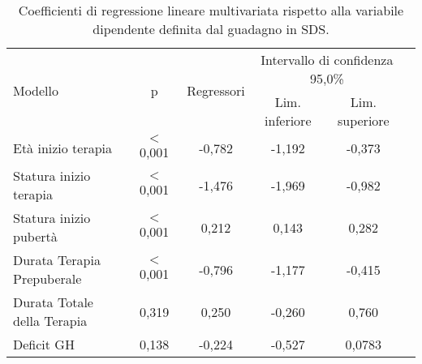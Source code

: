 \begin{table}[!h]
\begin{center}
\addtolength{\tabcolsep}{-2pt}
\begin{tabular}{l c c c c c}
\toprule
\multirow{2}{*}{Modello}	& \multirow{2}{*}{p} & \multirow{2}{*}{Regressori} & \multicolumn{2}{c}{Intervallo di confidenza 95,0\%} \\
\cmidrule(r){4-5}
				& 		&	& Lim. inferiore & Lim. superiore \\
\midrule                	                	
Età inizio terapia		& $<$ 0,001	&-0,782	& -1,192  & -0,373 \\
Statura inizio terapia		& $<$ 0,001	&-1,476	& -1,969  & -0,982 \\
Statura inizio pubertà		& $<$ 0,001	& 0,212	& 0,143	  & 0,282 \\
Durata Terapia Prepuberale	& $<$ 0,001	&-0,796	& -1,177  & -0,415 \\
Durata Totale della Terapia	& 0,319		& 0,250	& -0,260  & 0,760 \\
Deficit GH			& 0,138		&-0,224	& -0,527  & 0,0783 \\ 
\bottomrule
\end{tabular} 
\end{center}
\caption{Coefficienti di regressione lineare multivariata rispetto alla variabile dipendente definita dal guadagno in SDS.}
\label{tab:Statistiche}
\end{table}


